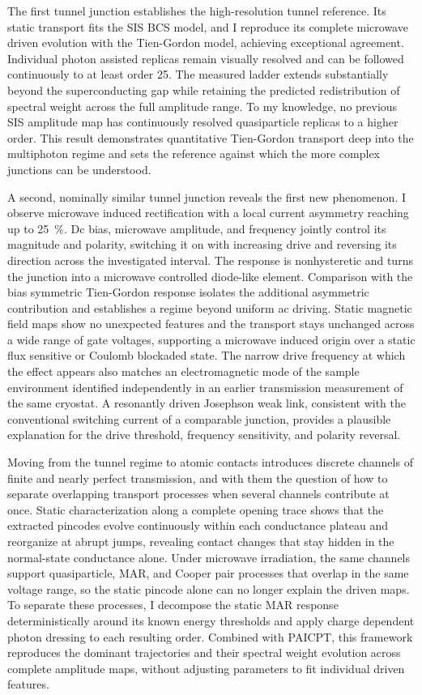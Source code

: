         The first tunnel junction establishes the high-resolution tunnel reference. Its static transport fits the SIS BCS model, and I reproduce its complete microwave driven evolution with the Tien-Gordon model, achieving exceptional agreement. Individual photon assisted replicas remain visually resolved and can be followed continuously to at least order 25. The measured ladder extends substantially beyond the superconducting gap while retaining the predicted redistribution of spectral weight across the full amplitude range. To my knowledge, no previous SIS amplitude map has continuously resolved quasiparticle replicas to a higher order. This result demonstrates quantitative Tien-Gordon transport deep into the multiphoton regime and sets the reference against which the more complex junctions can be understood.

        A second, nominally similar tunnel junction reveals the first new phenomenon. I observe microwave induced rectification with a local current asymmetry reaching up to \qty{25}{\percent}. Dc bias, microwave amplitude, and frequency jointly control its magnitude and polarity, switching it on with increasing drive and reversing its direction across the investigated interval. The response is nonhysteretic and turns the junction into a microwave controlled diode-like element. Comparison with the bias symmetric Tien-Gordon response isolates the additional asymmetric contribution and establishes a regime beyond uniform ac driving. Static magnetic field maps show no unexpected features and the transport stays unchanged across a wide range of gate voltages, supporting a microwave induced origin over a static flux sensitive or Coulomb blockaded state. The narrow drive frequency at which the effect appears also matches an electromagnetic mode of the sample environment identified independently in an earlier transmission measurement of the same cryostat. A resonantly driven Josephson weak link, consistent with the conventional switching current of a comparable junction, provides a plausible explanation for the drive threshold, frequency sensitivity, and polarity reversal.

        Moving from the tunnel regime to atomic contacts introduces discrete channels of finite and nearly perfect transmission, and with them the question of how to separate overlapping transport processes when several channels contribute at once. Static characterization along a complete opening trace shows that the extracted pincodes evolve continuously within each conductance plateau and reorganize at abrupt jumps, revealing contact changes that stay hidden in the normal-state conductance alone. Under microwave irradiation, the same channels support quasiparticle, MAR, and Cooper pair processes that overlap in the same voltage range, so the static pincode alone can no longer explain the driven maps. To separate these processes, I decompose the static MAR response deterministically around its known energy thresholds and apply charge dependent photon dressing to each resulting order. Combined with PAICPT, this framework reproduces the dominant trajectories and their spectral weight evolution across complete amplitude maps, without adjusting parameters to fit individual driven features.


